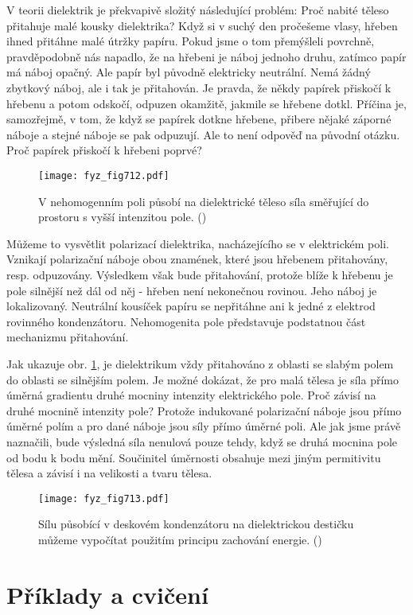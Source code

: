     V teorii dielektrik je překvapivě složitý následující problém: Proč nabité těleso přitahuje malé
    kousky dielektrika? Když si v suchý den pročešeme vlasy, hřeben ihned přitáhne malé útržky
    papíru. Pokud jsme o tom přemýšleli povrchně, pravděpodobně nás napadlo, že na hřebeni je náboj
    jednoho druhu, zatímco papír má náboj opačný. Ale papír byl původně elektricky neutrální. Nemá
    žádný zbytkový náboj, ale i tak je přitahován. Je pravda, že někdy papírek přiskočí k hřebenu a
    potom odskočí, odpuzen okamžitě, jakmile se hřebene dotkl. Příčina je, samozřejmě, v tom, že
    když se papírek dotkne hřebene, přibere nějaké záporné náboje a stejné náboje se pak odpuzují.
    Ale to není odpověď na původní otázku. Proč papírek přiskočí k hřebeni poprvé?

    \begin{figure}[ht!] %
      \centering
      \texttt{[image: fyz\_fig712.pdf]}
      \caption{V nehomogenním poli působí na dielektrické těleso síla směřující do prostoru s vyšší
              intenzitou pole. (\cite[s.~184]{Feynman02})}
      \label{fyz:fig712}
    \end{figure}

    Můžeme to vysvětlit polarizací dielektrika, nacházejícího se v elektrickém poli. Vznikají
    polarizační náboje obou znamének, které jsou hřebenem přitahovány, resp. odpuzovány. Výsledkem
    však bude přitahování, protože blíže k hřebenu je pole silnější než dál od něj - hřeben není
    nekonečnou rovinou. Jeho náboj je lokalizovaný. Neutrální kousíček papíru se nepřitáhne ani k
    jedné z elektrod rovinného kondenzátoru. Nehomogenita pole představuje podstatnou část
    mechanizmu přitahování.

    Jak ukazuje obr. \ref{fyz:fig712}, je dielektrikum vždy přitahováno z oblasti se slabým polem do
    oblasti se silnějším polem. Je možné dokázat, že pro malá tělesa je síla přímo úměrná gradientu
    druhé mocniny intenzity elektrického pole. Proč závisí na druhé mocnině intenzity pole? Protože
    indukované polarizační náboje jsou přímo úměrné polím a pro dané náboje jsou síly přímo úměrné
    poli. Ale jak jsme právě naznačili, bude výsledná síla nenulová pouze tehdy, když se druhá
    mocnina pole od bodu k bodu mění. Součinitel úměrnosti obsahuje mezi jiným permitivitu tělesa a
    závisí i na velikosti a tvaru tělesa.

    \begin{figure}[ht!] %
      \centering
      \texttt{[image: fyz\_fig713.pdf]}
      \caption{Sílu působící v deskovém kondenzátoru na dielektrickou destičku můžeme vypočítat
               použitím principu zachování energie. (\cite[s.~707]{Feynman02})}
      \label{fyz:fig713}
    \end{figure}

  \section{Příklady a cvičení}\label{fyz:IIchapXsecVI}



